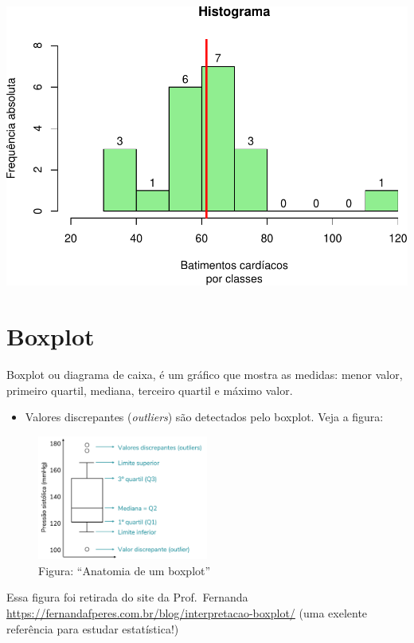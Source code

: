 \documentclass[
]{book}
\providecommand{\tightlist}{%
  \setlength{\itemsep}{0pt}\setlength{\parskip}{0pt}}
\begin{document}
\includegraphics{Livro-Estatistica+R_files/figure-latex/unnamed-chunk-18-1.pdf}

\section{Boxplot}\label{boxplot}

Boxplot ou diagrama de caixa, é um gráfico que mostra as medidas: menor valor, primeiro quartil, mediana, terceiro quartil e máximo valor.

\begin{itemize}
\tightlist
\item
  Valores discrepantes (\emph{outliers}) são detectados pelo boxplot. Veja a figura:
\end{itemize}

\begin{figure}
\centering
\includegraphics[width=0.5\textwidth,height=\textheight]{Boxplotexemplo.png}
\caption{Figura: ``Anatomia de um boxplot''}
\end{figure}

Essa figura foi retirada do site da Prof.~Fernanda \url{https://fernandafperes.com.br/blog/interpretacao-boxplot/} (uma exelente referência para estudar estatística!)
\end{document}
